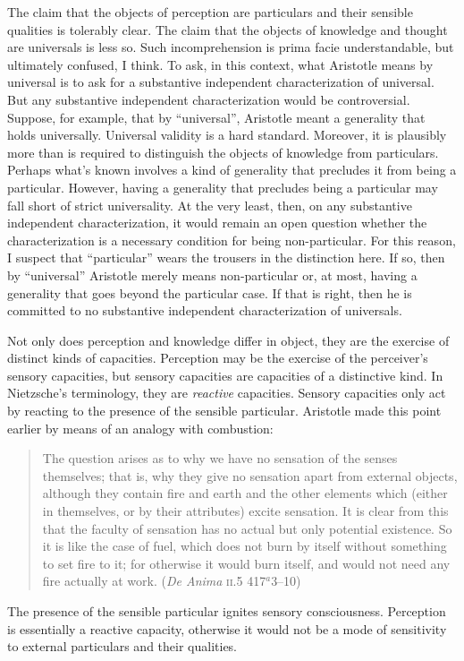 The claim that the objects of perception are particulars and their sensible qualities is tolerably clear. The claim that the objects of knowledge and thought are universals is less so. Such incomprehension is prima facie understandable, but ultimately confused, I think. To ask, in this context, what Aristotle means by universal is to ask for a substantive independent characterization of universal. But any substantive independent characterization would be controversial. Suppose, for example, that by ``universal'', Aristotle meant a generality that holds universally. Universal validity is a hard standard. Moreover, it is plausibly more than is required to distinguish the objects of knowledge from particulars. Perhaps what's known involves a kind of generality that precludes it from being a particular. However, having a generality that precludes being a particular may fall short of strict universality. At the very least, then, on any substantive independent characterization, it would remain an open question whether the characterization is a necessary condition for being non-particular. For this reason, I suspect that ``particular'' wears the trousers in the distinction here. If so, then by ``universal'' Aristotle merely means non-particular or, at most, having a generality that goes beyond the particular case. If that is right, then he is committed to no substantive independent characterization of universals.

Not only does perception and knowledge differ in object, they are the exercise of distinct kinds of capacities. Perception may be the exercise of the perceiver's sensory capacities, but sensory capacities are capacities of a distinctive kind. In Nietzsche's \citeyearpar{Nietzsche1887On-the-Genealog} terminology, they are \emph{reactive} capacities. Sensory capacities only act by reacting to the presence of the sensible particular. Aristotle made this point earlier by means of an analogy with combustion:
\begin{quote}
	The question arises as to why we have no sensation of the senses themselves; that is, why they give no sensation apart from external objects, although they contain fire and earth and the other elements which (either in themselves, or by their attributes) excite sensation. It is clear from this that the faculty of sensation has no actual but only potential existence. So it is like the case of fuel, which does not burn by itself without something to set fire to it; for otherwise it would burn itself, and would not need any fire actually at work. (\emph{De Anima} \textsc{ii}.5 417\( ^{a} \)3--10)
\end{quote}
The presence of the sensible particular ignites sensory consciousness. Perception is essentially a reactive capacity, otherwise it would not be a mode of sensitivity to external particulars and their qualities.

